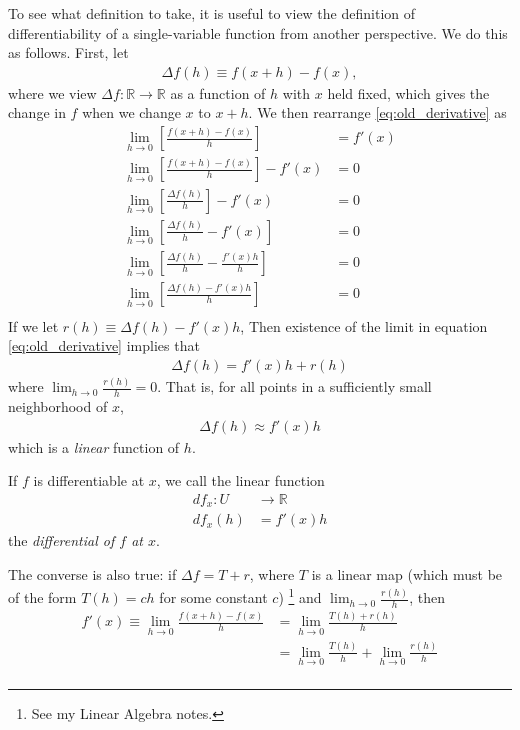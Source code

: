 \documentclass[12pt,letterpaper,reqno]{article}
\numberwithin{equation}{section}
\newcommand{\R}{\ensuremath{\mathbb R}}
\begin{document}
{To see what definition to take, it is useful to view the definition of differentiability of a single-variable function from another perspective. We do this as follows. First, let 
\begin{align*}
	\Delta f(h)\equiv f(x+h)-f(x),
\end{align*}
where we view $\Delta f:\R \to \R$ as a function of $h$ with $x$ held fixed, which gives the change in $f$ when we change $x$ to $x+h$. We then rearrange \eqref{eq:old_derivative} as 
\begin{align*}
	\lim_{h \to 0}\left[\frac{f(x+h)-f(x)}{h}\right]&=f'(x) \\
	\lim_{h \to 0}\left[\frac{f(x+h)-f(x)}{h}\right]-f'(x)&=0 \\
	\lim_{h \to 0}\left[\frac{\Delta f(h)}{h}\right]-f'(x)&=0 \\
	\lim_{h \to 0}\left[\frac{\Delta f(h)}{h}-f'(x)\right]&=0 \\
	\lim_{h \to 0}\left[\frac{\Delta f(h)}{h}-\frac{f'(x)h}{h}\right]&=0 \\
	\lim_{h \to 0}\left[\frac{\Delta f(h)-f'(x)h}{h}\right]&=0 \\
\end{align*} 
If we let $r(h) \equiv \Delta f(h)-f'(x)h$, Then existence of the limit in equation \eqref{eq:old_derivative} implies that 
\begin{align}
	\Delta f(h)=f'(x)h+r(h)
\end{align}
where $\lim_{h \to 0}\frac{r(h)}{h}=0$. That is, for all points in a sufficiently small neighborhood of $x$,
\begin{align}
	\Delta f(h) \approx f'(x)h
\end{align}
which is a \emph{linear} function of $h$. 
\begin{defn}
If $f$ is differentiable at $x$, we call the linear function 
\begin{align*}
	df_x:U &\to \R \\
	df_x(h)&=f'(x)h
\end{align*}	
the \emph{differential of $f$ at $x$}.
\end{defn}
The converse is also true: if $\Delta f=T+r$, where $T$ is a linear map (which must be of the form $T(h)=ch$ for some constant $c$) \footnote{See my Linear Algebra notes.} and $\lim_{h\to 0}\frac{r(h)}{h}$, then
\begin{align*}
	f'(x)\equiv \lim_{h \to 0}\frac{f(x+h)-f(x)}{h}&=\lim_{h \to 0}\frac{T(h)+r(h)}{h}\\
	&=\lim_{h \to 0}\frac{T(h)}{h}+\lim_{h \to 0}\frac{r(h)}{h} \\

\end{align*}}
\end{document}
